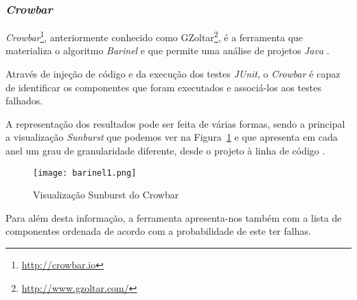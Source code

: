 % 
%
\subsubsection{\emph{Crowbar}}

\emph{Crowbar}\footnote{ \url{http://crowbar.io}}, anteriormente conhecido como GZoltar\footnote{ \url{http://www.gzoltar.com/}}, é a ferramenta que materializa o algoritmo \emph{Barinel} e que permite uma análise de projetos \emph{Java} \cite{Campos2012}.

Através de injeção de código e da execução dos testes \emph{JUnit}, o \emph{Crowbar} é capaz de identificar os componentes que foram executados e associá-los aos testes falhados.

A representação dos resultados pode ser feita de várias formas, sendo a principal a visualização \emph{Sunburst} que podemos ver na Figura~\ref{fig:crowbar-sunburst} e que apresenta em cada anel um grau de granularidade diferente, desde o projeto à linha de código \cite{Gouveia2013}.

\begin{figure}[H]
  \begin{center}
    \leavevmode
    \texttt{[image: barinel1.png]}
    \caption{Visualização Sunburst do Crowbar}
    \label{fig:crowbar-sunburst}
  \end{center}
\end{figure}

Para além desta informação, a ferramenta apresenta-nos também com a lista de componentes ordenada de acordo com a probabilidade de este ter falhas.